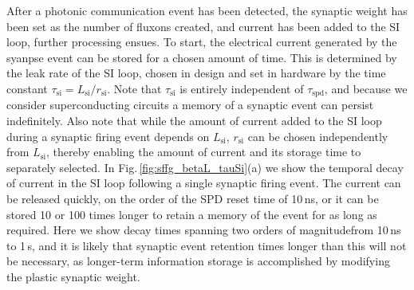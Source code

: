\documentclass[twocolumn]{article}
\begin{document}
\begin{figure} 
\end{figure}
After a photonic communication event has been detected, the synaptic weight has been set as the number of fluxons created, and current has been added to the SI loop, further processing ensues. To start, the electrical current generated by the syanpse event can be stored for a chosen amount of time. This is determined by the leak rate of the SI loop, chosen in design and set in hardware by the time constant $\tau_{\mathrm{si}} = L_{\mathrm{si}}/r_{\mathrm{si}}$. Note that $\tau_{\mathrm{si}}$ is entirely independent of $\tau_{\mathrm{spd}}$, and because we consider superconducting circuits a memory of a synaptic event can persist indefinitely. Also note that while  the amount of current added to the SI loop during a synaptic firing event depends on $L_{\mathrm{si}}$, $r_{\mathrm{si}}$ can be chosen independently from $L_{\mathrm{si}}$, thereby enabling the amount of current and its storage time to separately selected. In Fig.\,\ref{fig:sffg_betaL_tauSi}(a) we show the temporal decay of current in the SI loop following a single synaptic firing event. The current can be released quickly, on the order of the SPD reset time of 10\,ns, or it can be stored 10 or 100 times longer to retain a memory of the event for as long as required. Here we show decay times spanning two orders of magnitude\textemdash from 10\,ns to 1\,\textmu s\textemdash, and it is likely that synaptic event retention times longer than this will not be necessary, as longer-term information storage is accomplished by modifying the plastic synaptic weight. 
\end{document}

